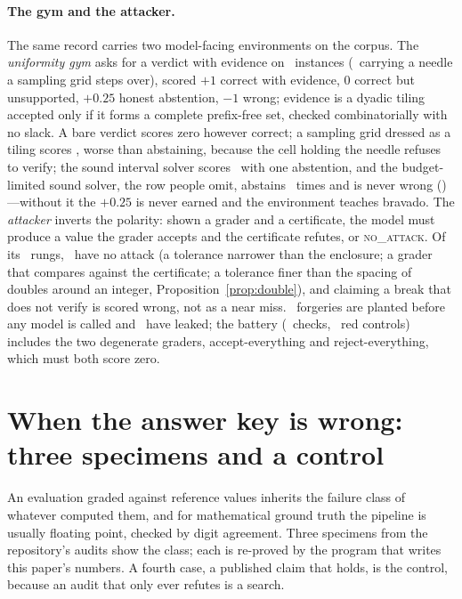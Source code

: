 \documentclass[11pt]{article}
\theoremstyle{definition}
\newcommand{\verdict}[1]{\textsc{#1}}
\begin{document}
\paragraph{The gym and the attacker.} The same record carries two model-facing environments on the corpus. The \emph{uniformity gym} asks for a verdict with evidence on \UnifInstances\ instances (\UnifNeedled\ carrying a needle a sampling grid steps over), scored $+1$ correct with evidence, $0$ correct but unsupported, $+0.25$ honest abstention, $-1$ wrong; evidence is a dyadic tiling accepted only if it forms a complete prefix-free set, checked combinatorially with no slack. A bare verdict scores zero however correct; a sampling grid dressed as a tiling scores \BluffScore, worse than abstaining, because the cell holding the needle refuses to verify; the sound interval solver scores \SoundScore\ with one abstention, and the budget-limited sound solver, the row people omit, abstains \BudgetAbstained\ times and is never wrong (\BudgetScore)---without it the $+0.25$ is never earned and the environment teaches bravado. The \emph{attacker} inverts the polarity: shown a grader and a certificate, the model must produce a value the grader accepts and the certificate refutes, or \verdict{no\_attack}. Of its \AttackRungs\ rungs, \AttackRungsNone\ have no attack (a tolerance narrower than the enclosure; a grader that compares against the certificate; a tolerance finer than the spacing of doubles around an integer, Proposition~\ref{prop:double}), and claiming a break that does not verify is scored wrong, not as a near miss. \EnvsForgeriesPlanted\ forgeries are planted before any model is called and \EnvsForgeriesLeaked\ have leaked; the battery (\EnvsBatteryPass\ checks, \EnvsBatteryReds\ red controls) includes the two degenerate graders, accept-everything and reject-everything, which must both score zero.

\section{When the answer key is wrong: three specimens and a control}\label{sec:keys}

An evaluation graded against reference values inherits the failure class of whatever computed them, and for mathematical ground truth the pipeline is usually floating point, checked by digit agreement. Three specimens from the repository's audits show the class; each is re-proved by the program that writes this paper's numbers. A fourth case, a published claim that holds, is the control, because an audit that only ever refutes is a search.
\end{document}
